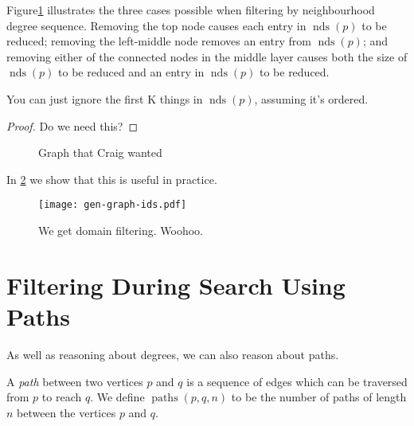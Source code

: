 \documentclass[letterpaper]{article}
\theoremstyle{definition}
\newcommand{\nds}{\operatorname{nds}}
\newcommand{\paths}{\operatorname{paths}}
\newcommand{\todo}[1]{{\color{red} {[}{#1}{]}}}
\begin{document}
Figure\ref{fig:nds} illustrates the three cases possible when filtering by neighbourhood degree
sequence.  Removing the top node causes each entry in $\nds(p)$ to be reduced; removing the 
left-middle node removes an entry from $\nds(p)$; and removing either of the connected nodes in the
middle layer causes both the size of $\nds(p)$ to be reduced and an entry in $\nds(p)$ to be reduced.

\begin{corollary}
You can just ignore the first K things in $\nds(p)$, assuming it's ordered.
\end{corollary}

\begin{proof}
Do we need this?
\end{proof}


\begin{figure}
    \begin{center}
        \caption{Graph that Craig wanted}
        \label{fig:nds}
    \end{center}
\end{figure}


In \cref{figure:ids} we show that this is useful in practice.

\begin{figure}
    \texttt{[image: gen-graph-ids.pdf]}
    \caption{We get domain filtering. Woohoo.}\label{figure:ids}
\end{figure}

\section{Filtering During Search Using Paths}

As well as reasoning about degrees, we can also reason about paths.

A \emph{path} between two vertices $p$ and $q$ is a sequence of edges which can be traversed from $p$ to reach $q$. We define $\paths(p,q,n)$ to be the number of paths of length $n$ between the vertices $p$ and $q$.
\end{document}
